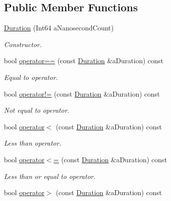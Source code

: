 \subsection*{Public Member Functions}
\begin{DoxyCompactItemize}
\item 
\hyperlink{classostk_1_1physics_1_1time_1_1_duration_a6ba3a020742ca6e3bf0b1970dd039c07}{Duration} (Int64 a\+Nanosecond\+Count)
\begin{DoxyCompactList}\small\item\em Constructor. \end{DoxyCompactList}\item 
bool \hyperlink{classostk_1_1physics_1_1time_1_1_duration_a92649b4f3f332daf372bb78ac1db6740}{operator==} (const \hyperlink{classostk_1_1physics_1_1time_1_1_duration}{Duration} \&a\+Duration) const
\begin{DoxyCompactList}\small\item\em Equal to operator. \end{DoxyCompactList}\item 
bool \hyperlink{classostk_1_1physics_1_1time_1_1_duration_a5e99b046bbf8aa1de0f8e212b7794e38}{operator!=} (const \hyperlink{classostk_1_1physics_1_1time_1_1_duration}{Duration} \&a\+Duration) const
\begin{DoxyCompactList}\small\item\em Not equal to operator. \end{DoxyCompactList}\item 
bool \hyperlink{classostk_1_1physics_1_1time_1_1_duration_a76fbb444ae7db2e6e61c237bf96b9032}{operator$<$} (const \hyperlink{classostk_1_1physics_1_1time_1_1_duration}{Duration} \&a\+Duration) const
\begin{DoxyCompactList}\small\item\em Less than operator. \end{DoxyCompactList}\item 
bool \hyperlink{classostk_1_1physics_1_1time_1_1_duration_a31b9328d64a66fd3f46ca8100b8dd91c}{operator$<$=} (const \hyperlink{classostk_1_1physics_1_1time_1_1_duration}{Duration} \&a\+Duration) const
\begin{DoxyCompactList}\small\item\em Less than or equal to operator. \end{DoxyCompactList}\item 
bool \hyperlink{classostk_1_1physics_1_1time_1_1_duration_a9daebcdc2a5ab12306630d85e44dcb7a}{operator$>$} (const \hyperlink{classostk_1_1physics_1_1time_1_1_duration}{Duration} \&a\+Duration) const

\end{DoxyCompactItemize}

